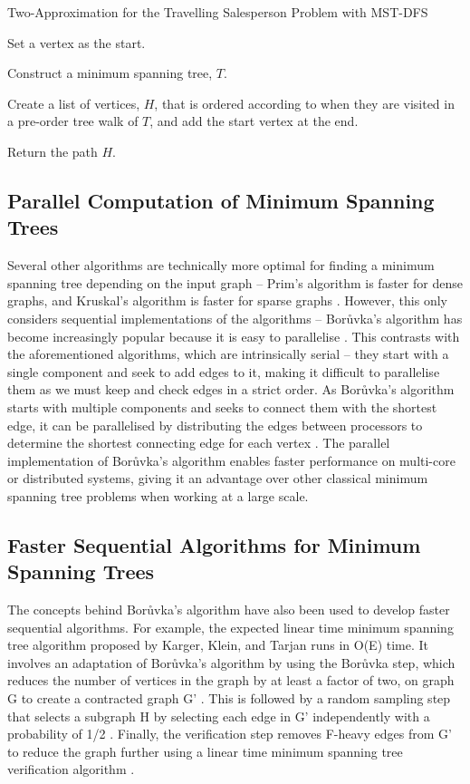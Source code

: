 \documentclass[a4paper, 11pt]{article}
\begin{document}
\begin{algorithm}
    \caption{Two-Approximation for the Travelling Salesperson Problem with MST-DFS \cite{andreae1995performance}}
    \nl Set a vertex as the start.
    
    \nl Construct a minimum spanning tree, $T$.
    
    \nl Create a list of vertices, $H$, that is ordered according to when they are visited in a pre-order tree walk of $T$, and add the start vertex at the end.
    
    \nl Return the path $H$.
\end{algorithm}

\subsection{Parallel Computation of Minimum Spanning Trees}
Several other algorithms are technically more optimal for finding a minimum spanning tree depending on the input graph -- Prim's algorithm is faster for dense graphs, and Kruskal's algorithm is faster for sparse graphs \cite{bazlamaccci2001minimum}. However, this only considers sequential implementations of the algorithms -- Borůvka's algorithm has become increasingly popular because it is easy to parallelise \cite{mariano2015generic}. This contrasts with the aforementioned algorithms, which are intrinsically serial -- they start with a single component and seek to add edges to it, making it difficult to parallelise them as we must keep and check edges in a strict order. As Borůvka's algorithm starts with multiple components and seeks to connect them with the shortest edge, it can be parallelised by distributing the edges between processors to determine the shortest connecting edge for each vertex \cite{chung1996parallel}. The parallel implementation of Borůvka's algorithm enables faster performance on multi-core or distributed systems, giving it an advantage over other classical minimum spanning tree problems when working at a large scale.

\subsection{Faster Sequential Algorithms for Minimum Spanning Trees}
The concepts behind Borůvka's algorithm have also been used to develop faster sequential algorithms. For example, the expected linear time minimum spanning tree algorithm proposed by Karger, Klein, and Tarjan runs in O(E) time. It involves an adaptation of Borůvka's algorithm by using the Borůvka step, which reduces the number of vertices in the graph by at least a factor of two, on graph G to create a contracted graph G' \cite{dixon1992verification, king1995simpler}. This is followed by a random sampling step that selects a subgraph H by selecting each edge in G' independently with a probability of 1/2 \cite{bazlamaccci2001minimum}. Finally, the verification step removes F-heavy edges from G' to reduce the graph further using a linear time minimum spanning tree verification algorithm \cite{dixon1992verification, king1995simpler, karger1995randomized}.

\newpage


\end{document}
